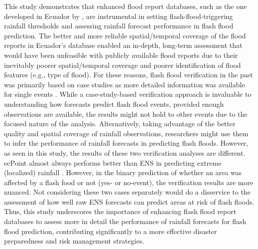 \documentclass[techmemo]{ecmwfrep}%
\begin{document}
This study demonstrates that enhanced flood report databases, such as the one developed in Ecuador by \cite{Kruczkiewicz2021a}, are instrumental in setting flash-flood-triggering rainfall thresholds and assessing rainfall forecast performance in flash flood prediction. The better and more reliable spatial/temporal coverage of the flood reports in Ecuador’s database enabled an in-depth, long-term assessment that would have been unfeasible with publicly available flood reports due to their inevitably poorer spatial/temporal coverage and poorer identification of flood features (e.g., type of flood). For these reasons, flash flood verification in the past was primarily based on case studies as more detailed information was available for single events \citep{Gaume2009}. While a case-study-based verification approach is invaluable to understanding how forecasts predict flash flood events, provided enough observations are available, the results might not hold to other events due to the focused nature of the analysis. Alternatively, taking advantage of the better quality and spatial coverage of rainfall observations, researchers might use them to infer the performance of rainfall forecasts in predicting flash floods. However, as seen in this study, the results of these two verification analyses are different. ecPoint almost always performs better than ENS in predicting extreme (localized) rainfall \citep{Gascon2023, Hemri2022, Hewson2021}. However, in the binary prediction of  whether an area was affected by a flash food or not (yes- or no-event), the verification results are more nuanced. Not considering these two cases separately would do a disservice to the assessment of how well raw ENS forecasts can predict areas at risk of flash floods. Thus, this study underscores the importance of enhancing flash flood report databases to assess more in detail the performance of rainfall forecasts for flash flood prediction, contributing significantly to a more effective disaster preparedness and risk management strategies.
\end{document}
